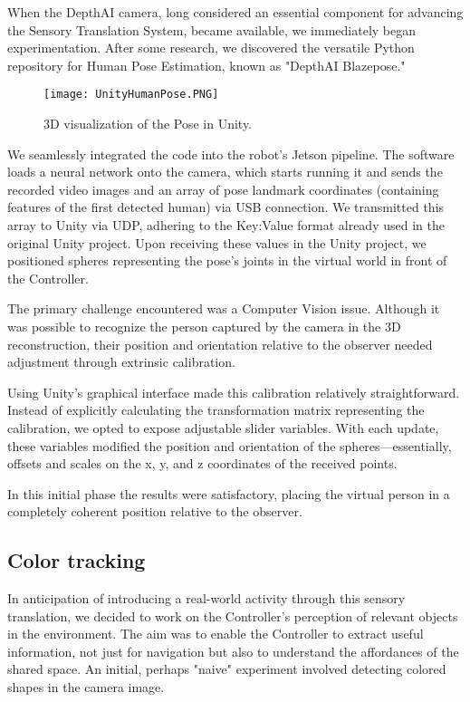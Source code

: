 \documentclass{Configuration_Files/PoliMi3i_thesis}
\begin{document}
When the DepthAI camera, long considered an essential component for advancing the Sensory Translation System, became available, we immediately began experimentation. After some research, we discovered the versatile Python repository for Human Pose Estimation, known as "DepthAI Blazepose."
\begin{figure}
    \centering
    \texttt{[image: UnityHumanPose.PNG]}
    \caption{3D visualization of the Pose in Unity.}
    \label{fig:unity_human_pose}
\end{figure}
We seamlessly integrated the code into the robot's Jetson pipeline. The software loads a neural network onto the camera, which starts running it and sends the recorded video images and an array of pose landmark coordinates (containing features of the first detected human) via USB connection. We transmitted this array to Unity via UDP, adhering to the Key:Value format already used in the original Unity project. Upon receiving these values in the Unity project, we positioned spheres representing the pose's joints in the virtual world in front of the Controller.

The primary challenge encountered was a Computer Vision issue. Although it was possible to recognize the person captured by the camera in the 3D reconstruction, their position and orientation relative to the observer needed adjustment through extrinsic calibration.

Using Unity's graphical interface made this calibration relatively straightforward. Instead of explicitly calculating the transformation matrix representing the calibration, we opted to expose adjustable slider variables. With each update, these variables modified the position and orientation of the spheres—essentially, offsets and scales on the x, y, and z coordinates of the received points.

In this initial phase the results were satisfactory, placing the virtual person in a completely coherent position relative to the observer.

\subsection{Color tracking}

In anticipation of introducing a real-world activity through this sensory translation, we decided to work on the Controller's perception of relevant objects in the environment. The aim was to enable the Controller to extract useful information, not just for navigation but also to understand the affordances of the shared space. An initial, perhaps "naive" experiment involved detecting colored shapes in the camera image.
\end{document}
